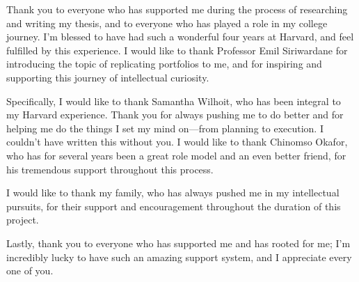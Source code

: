 
Thank you to everyone who has supported me during the process of researching and writing my thesis, and to everyone who has played a role in my college journey. I'm blessed to have had such a wonderful four years at Harvard, and feel fulfilled by this experience. I would like to thank Professor Emil Siriwardane for introducing the topic of replicating portfolios to me, and for inspiring and supporting this journey of intellectual curiosity.

Specifically, I would like to thank Samantha Wilhoit, who has been integral to my Harvard experience. Thank you for always pushing me to do better and for helping me do the things I set my mind on—from planning to execution. I couldn't have written this without you. I would like to thank Chinomso Okafor, who has for several years been a great role model and an even better friend, for his tremendous support throughout this process. 

I would like to thank my family, who has always pushed me in my intellectual pursuits, for their support and encouragement throughout the duration of this project.

Lastly, thank you to everyone who has supported me and has rooted for me; I'm incredibly lucky to have such an amazing support system, and I appreciate every one of you.
